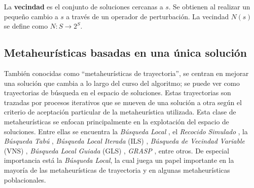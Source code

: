 
\begin{definicion}
La \textbf{vecindad} \cite{talbi2009metaheuristics} es el conjunto de soluciones cercanas a $s$. Se obtienen al realizar un pequeño cambio a $s$ a través de un operador de perturbación. La vecindad $N(s)$ se define como $N:S \rightarrow 2^S$. 
\end{definicion}

\subsection{Metaheurísticas basadas en una única solución}

También conocidas como ``metaheurísticas de trayectoria'', se centran en mejorar una solución que cambia a lo largo del curso del algoritmo; se puede ver como trayectorias de búsqueda en el espacio de soluciones. Estas trayectorias son trazadas por procesos iterativos que se mueven de una solución a otra según el criterio de aceptación particular de la metaheurística utilizada. Esta clase de metaheurísticas se enfocan principalmente en la explotación del espacio de soluciones. Entre ellas se encuentra la \emph{Búsqueda Local} \cite{talbi2009metaheuristics,aarts2003local}, el \emph{Recocido Simulado} \cite{talbi2009metaheuristics,kirkpatrick1983optimization}, la \emph{Búsqueda Tabú} \cite{talbi2009metaheuristics,glover1989tabu}, \emph{Búsqueda Local Iterada} (ILS) \cite{lourencco2003iterated}, \emph{Búsqueda de Vecindad Variable} (VNS) \cite{mladenovic1997variable}, \emph{Búsqueda Local Guiada} (GLS) \cite{voudouris1998guided}, \emph{GRASP} \cite{feo1995greedy}, entre otros. De especial importancia está la \emph{Búsqueda Local}, la cual juega un papel importante en la mayoría de las metaheurísticas de trayectoria y en algunas metaheurísticas poblacionales.\\ 

